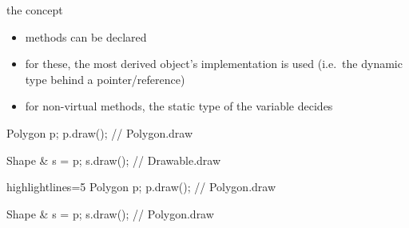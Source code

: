 \begin{frame}[fragile]
  \begin{block}{the concept}
    \begin{itemize}
    \item methods can be declared 
    \item for these, the most derived object's implementation is used
          (i.e.\ the dynamic type behind a pointer/reference)
    \item for non-virtual methods, the static type of the variable decides
    \end{itemize}
  \end{block}
  \begin{overprint}
  \begin{multicols}{2}
    \begin{cppcode*}{}
      Polygon p;
      p.draw(); // Polygon.draw

      Shape & s = p;
      s.draw(); // Drawable.draw
    \end{cppcode*}
    \columnbreak
    \center
  \end{multicols}

    \begin{multicols}{2}
    \begin{cppcode*}{highlightlines=5}
      Polygon p;
      p.draw(); // Polygon.draw

      Shape & s = p;
      s.draw(); // Polygon.draw
    \end{cppcode*}
    \columnbreak
    \center
  \end{multicols}
  \end{overprint}
\end{frame}

